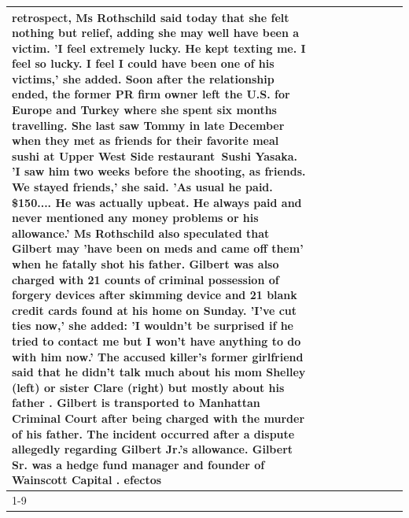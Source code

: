 \begin{table}[H]
\begin{tabular}{lllrlllll}
retrospect, Ms Rothschild said today that she felt nothing but relief, adding she may well have been a victim. 'I feel extremely lucky. He kept texting me. I feel so lucky. I feel I could have been one of his victims,' she added. Soon after the relationship ended, the former PR firm owner left the U.S. for Europe and Turkey where she spent six months  travelling. She last saw Tommy in late December when they met as friends for their favorite meal sushi at Upper West Side restaurant Sushi Yasaka. 'I saw him two weeks before the shooting, as friends. We stayed friends,' she said. 'As usual he paid. \$150.... He was actually upbeat. He always paid and never mentioned any money problems or his allowance.' Ms Rothschild also speculated that Gilbert may 'have been on meds and came off them' when he fatally shot his father. Gilbert was also charged with 21 counts of criminal possession of forgery devices after skimming device and 21 blank credit cards found at his home on Sunday. 'I've cut ties now,' she added: 'I wouldn’t be surprised if he tried to contact me but I won’t have anything to do with him now.' The accused killer's former girlfriend said that he didn't talk much about his mom Shelley (left) or sister Clare (right) but mostly about his father . Gilbert is transported to Manhattan Criminal Court  after being charged with the murder of his father. The incident occurred after a dispute allegedly regarding Gilbert Jr.'s allowance. Gilbert Sr. was a hedge fund manager and founder of Wainscott Capital . efectos \\
\cline{1-9}

\end{tabular}
\end{table}

